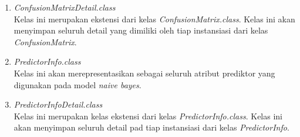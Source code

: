 \begin{enumerate}
\item{\textit{ConfusionMatrixDetail.class}} \\
Kelas ini merupakan ekstensi dari kelas \textit{ConfusionMatrix.class}. Kelas ini akan menyimpan seluruh detail yang dimiliki oleh tiap instansiasi dari kelas \textit{ConfusionMatrix}.
\item{\textit{PredictorInfo.class}} \\
Kelas ini akan merepresentasikan sebagai seluruh atribut prediktor yang digunakan pada model \textit{naive bayes}.
\item{\textit{PredictorInfoDetail.class}} \\
Kelas ini merupakan kelas ekstensi dari kelas \textit{PredictorInfo.class}. Kelas ini akan menyimpan seluruh detail pad tiap instansiasi dari kelas \textit{PredictorInfo}.
\end{enumerate}

